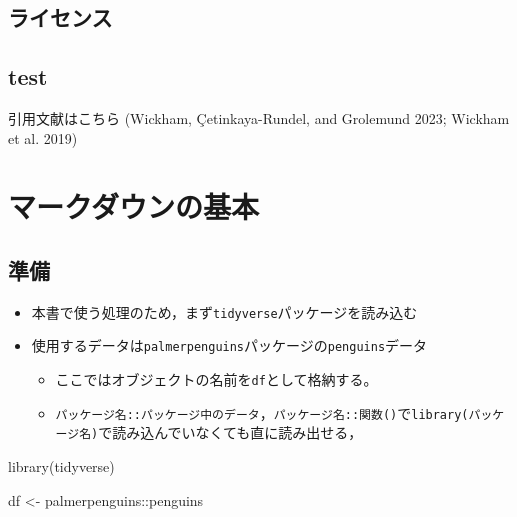 \documentclass[
  b5paper,
  xelatex, ja=standard]{bxjsbook}
\newenvironment{Shaded}{\begin{snugshade}}{\end{snugshade}}
\newcommand{\FunctionTok}[1]{\textcolor[rgb]{0.28,0.35,0.67}{#1}}
\newcommand{\NormalTok}[1]{\textcolor[rgb]{0.00,0.23,0.31}{#1}}
\newcommand{\OtherTok}[1]{\textcolor[rgb]{0.00,0.23,0.31}{#1}}
\newcommand{\SpecialCharTok}[1]{\textcolor[rgb]{0.37,0.37,0.37}{#1}}
\providecommand{\tightlist}{%
  \setlength{\itemsep}{0pt}\setlength{\parskip}{0pt}}\usepackage{longtable,booktabs,array}
\begin{document}
\section*{ライセンス}\label{ux30e9ux30a4ux30bbux30f3ux30b9}


\section*{test}\label{test}


引用文献はこちら (Wickham, Çetinkaya-Rundel, and Grolemund 2023; Wickham
et al. 2019)


\chapter{マークダウンの基本}\label{sec-basic}

\section{準備}\label{ux6e96ux5099}

\begin{itemize}
\tightlist
\item
  本書で使う処理のため，まず\texttt{tidyverse}パッケージを読み込む
\item
  使用するデータは\texttt{palmerpenguins}パッケージの\texttt{penguins}データ

  \begin{itemize}
  \tightlist
  \item
    ここではオブジェクトの名前を\texttt{df}として格納する。
  \item
    \texttt{パッケージ名::パッケージ中のデータ}，\texttt{パッケージ名::関数()}で\texttt{library(パッケージ名)}で読み込んでいなくても直に読み出せる，
  \end{itemize}
\end{itemize}

\begin{Shaded}
\begin{Highlighting}[]
\FunctionTok{library}\NormalTok{(tidyverse)}

\NormalTok{df }\OtherTok{\textless{}{-}} 
\NormalTok{  palmerpenguins}\SpecialCharTok{::}\NormalTok{penguins}
\end{Highlighting}
\end{Shaded}
\end{document}
